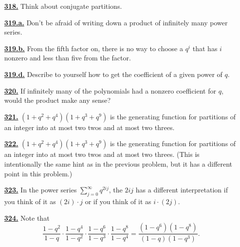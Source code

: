 \documentclass[10pt,]{book}
\theoremstyle{plain}
\theoremstyle{definition}
\theoremstyle{definition}
\theoremstyle{definition}
\numberwithin{equation}{chapter}
\begin{document}
\begin{itemize}[itemsep=1em]
\hypertarget{a-318}{}\item[\textbf{\hyperref[atmostmparts]{318.}}]
\hypertarget{p-1578}{}%
Think about conjugate partitions.%

\hypertarget{a-319.a}{}\item[\textbf{\hyperref[task-273]{319.a.}}]
\hypertarget{p-1582}{}%
Don't be afraid of writing down a product of infinitely many power series.%

\hypertarget{a-319.b}{}\item[\textbf{\hyperref[task-274]{319.b.}}]
\hypertarget{p-1585}{}%
From the fifth factor on, there is no way to choose a \(q^i\) that has \(i\) nonzero and less than five from the factor.%

\hypertarget{a-319.d}{}\item[\textbf{\hyperref[task-276]{319.d.}}]
\hypertarget{p-1590}{}%
Describe to yourself how to get the coefficient of a given power of \(q\).%

\hypertarget{a-320}{}\item[\textbf{\hyperref[activity-313]{320.}}]
\hypertarget{p-1596}{}%
If infinitely many of the polynomials had a nonzero coefficient for \(q\), would the product make any sense?%

\hypertarget{a-321}{}\item[\textbf{\hyperref[activity-314]{321.}}]
\hypertarget{p-1599}{}%
\((1 + q^2 + q^4 )(1 + q^3 + q^9 )\) is the generating function for partitions of an integer into at most two twos and at most two threes.%

\hypertarget{a-322}{}\item[\textbf{\hyperref[activity-315]{322.}}]
\hypertarget{p-1602}{}%
\((1 + q^2 + q^4 )(1 + q^3 + q^9 )\) is the generating function for partitions of an integer into at most two twos and at most two threes. (This is intentionally the same hint as in the previous problem, but it has a different point in this problem.)%

\hypertarget{a-323}{}\item[\textbf{\hyperref[activity-316]{323.}}]
\hypertarget{p-1605}{}%
In the power series \(\sum_{j=0}^\infty q^{2ij}\), the \(2ij\) has a different interpretation if you think of it as \((2i) \cdot j\) or if you think of it as \(i \cdot (2j)\).%

\hypertarget{a-324}{}\item[\textbf{\hyperref[activity-317]{324.}}]
\hypertarget{p-1608}{}%
Note that%
\begin{equation*}
\frac{1-q^2}{1-q}\cdot \frac{1-q^4}{1-q^2}\cdot \frac{1-q^6}{1-q^3}\cdot \frac{1-q^8}{1-q^4} = \frac{(1-q^6)(1-q^8)}{(1-q)(1-q^3)} \text{.}
\end{equation*}
%


\end{itemize}
\end{document}
